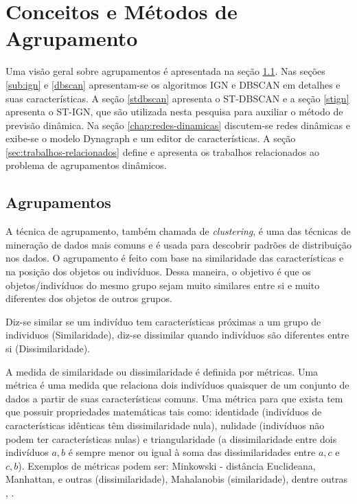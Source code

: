 \chapter{Conceitos e Métodos de Agrupamento}
\label{chap:estadodaarte}

Uma visão geral sobre agrupamentos é apresentada na seção \ref{agrupamentos}. Nas seções \ref{sub:ign} e \ref{dbscan} apresentam-se os algoritmos \acrshort{IGN} e \acrshort{DBSCAN} em detalhes e suas características. A seção \ref{stdbscan} apresenta o \acrshort{ST-DBSCAN} e a seção \ref{stign} apresenta o \acrshort{ST-IGN}, que são utilizada nesta pesquisa para auxiliar o método de previsão dinâmica. Na seção \ref{chap:redes-dinamicas} discutem-se redes dinâmicas e exibe-se o modelo Dynagraph e um editor de características. A seção \ref{sec:trabalhos-relacionados} define e apresenta os trabalhos relacionados ao problema de agrupamentos dinâmicos.

\section{Agrupamentos}
\label{agrupamentos}

A técnica de agrupamento, também chamada de \textit{clustering}, é uma das técnicas de mineração de dados mais comuns e é usada para descobrir padrões de distribuição nos dados. O agrupamento é feito com base na similaridade das características e na posição dos objetos ou indivíduos. Dessa maneira, o objetivo é que os objetos/indivíduos do mesmo grupo sejam muito similares entre si e muito diferentes dos objetos de outros grupos. 

Diz-se similar se um indivíduo tem características próximas a um grupo de individuos (Similaridade), diz-se dissimilar quando indivíduos são diferentes entre si (Dissimilaridade).

A medida de similaridade ou dissimilaridade é definida por métricas. Uma métrica é uma medida que relaciona dois indivíduos quaisquer de um conjunto de dados a partir de suas características comuns. Uma métrica para que exista tem que possuir propriedades matemáticas tais como: identidade (indivíduos de características idênticas têm dissimilaridade nula), nulidade (indivíduos não podem ter características nulas) e triangularidade (a dissimilaridade entre dois indivíduos $a,b$ é sempre menor ou igual à soma das dissimilaridades entre $a,c$ e $c,b$). Exemplos de métricas podem ser: Minkowski - distância Euclideana, Manhattan, e outras (dissimilaridade), Mahalanobis (similaridade), dentre outras \cite{Minkowski:2012}, \cite{Mahalanobis:1993}.

